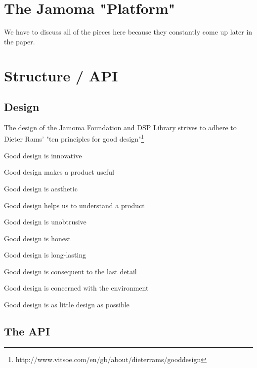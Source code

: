 \documentclass[twoside,10pt]{article}
\newenvironment{packed_item}{
\begin{itemize}
  \setlength{\itemsep}{1pt}
  \setlength{\parskip}{0pt}
  \setlength{\parsep}{0pt}
}{\end{itemize}}
\begin{document}



\section{The Jamoma "Platform"} %

We have to discuss all of the pieces here because they constantly come up later in the paper.





\section{Structure / API} %

\subsection{Design}

The design of the Jamoma Foundation and DSP Library strives to adhere to Dieter Rams' "ten principles for good design"\footnote{http://www.vitsoe.com/en/gb/about/dieterrams/gooddesign}
\begin{packed_item}%
	\item Good design is innovative
	\item Good design makes a product useful
	\item Good design is aesthetic
	\item Good design helps us to understand a product
	\item Good design is unobtrusive
	\item Good design is honest
	\item Good design is long-lasting
	\item Good design is consequent to the last detail
	\item Good design is concerned with the environment
	\item Good design is as little design as possible
\end{packed_item}%


\subsection{The API}
\end{document}
